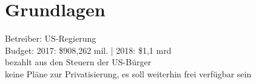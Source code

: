 \section{Grundlagen}
\label{sec:grundlagen}

Betreiber: US-Regierung \\
Budget: 2017: \$908,262 mil. | 2018: \$1,1 mrd\\
bezahlt aus den Steuern der US-Bürger \\
keine Pläne zur Privatisierung, es soll weiterhin frei verfügbar sein
